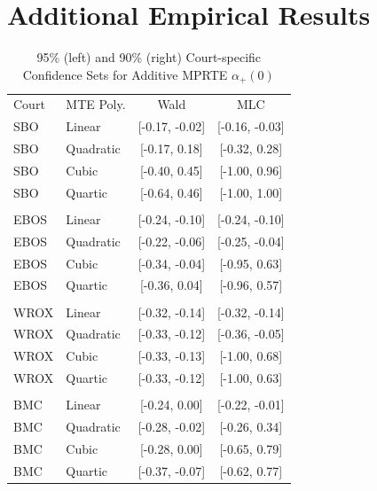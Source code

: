 \documentclass[11pt]{article}
\theoremstyle{definition}
\newcommand{\0}{\ensuremath{\mathbf{0}}}
\begin{document}
\begin{bibunit}
\begin{figure}[htbp]
    \label{fig:power_curve_lmte}
\end{figure}


\newpage

%
\section{Additional Empirical Results}
\label{appendix:add_empirical_results}


%
%

%
%
%

\begin{table}[htbp]
\scriptsize
  \centering
  \caption{95\% (left) and 90\% (right) Court-specific Confidence Sets for Additive MPRTE ${\alpha}_+(0)$}
    \begin{tabular}{llcc}
    \toprule
    Court & MTE Poly. & Wald  & MLC \\
    SBO   & Linear & [-0.17, -0.02] & [-0.16, -0.03] \\
    SBO   & Quadratic & [-0.17, 0.18] & [-0.32, 0.28] \\
    SBO   & Cubic & [-0.40, 0.45] & [-1.00, 0.96] \\
    SBO   & Quartic & [-0.64, 0.46] & [-1.00, 1.00] \\
          &       &       &  \\
    EBOS  & Linear & [-0.24, -0.10] & [-0.24, -0.10] \\
    EBOS  & Quadratic & [-0.22, -0.06] & [-0.25, -0.04] \\
    EBOS  & Cubic & [-0.34, -0.04] & [-0.95, 0.63] \\
    EBOS  & Quartic & [-0.36, 0.04] & [-0.96, 0.57] \\
          &       &       &  \\
    WROX  & Linear & [-0.32, -0.14] & [-0.32, -0.14] \\
    WROX  & Quadratic & [-0.33, -0.12] & [-0.36, -0.05] \\
    WROX  & Cubic & [-0.33, -0.13] & [-1.00, 0.68] \\
    WROX  & Quartic & [-0.33, -0.12] & [-1.00, 0.63] \\
          &       &       &  \\
    BMC   & Linear & [-0.24, 0.00] & [-0.22, -0.01] \\
    BMC   & Quadratic & [-0.28, -0.02] & [-0.26, 0.34] \\
    BMC   & Cubic & [-0.28, 0.00] & [-0.65, 0.79] \\
    BMC   & Quartic & [-0.37, -0.07] & [-0.62, 0.77] \\

\end{tabular}
\end{table}
\end{bibunit}
\end{document}

